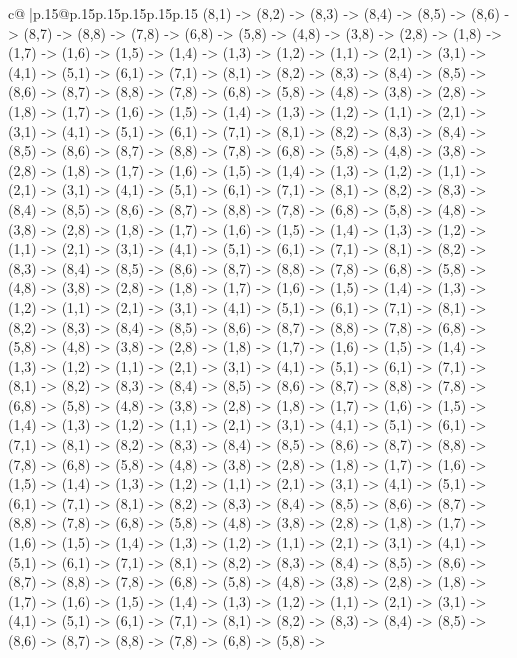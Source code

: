 \documentclass{article}
\begin{document}
{\begin{supertabular}{c@{$\;$}|p{.15\linewidth}@{}p{.15\linewidth}p{.15\linewidth}p{.15\linewidth}p{.15\linewidth}p{.15\linewidth}}
{{{(8,1) {-}> (8,2) {-}> (8,3) {-}> (8,4) {-}> (8,5) {-}> (8,6) {-}> (8,7) {-}> (8,8) {-}> (7,8) {-}> (6,8) {-}> (5,8) {-}> (4,8) {-}> (3,8) {-}> (2,8) {-}> (1,8) {-}> (1,7) {-}> (1,6) {-}> (1,5) {-}> (1,4) {-}> (1,3) {-}> (1,2) {-}> (1,1) {-}> (2,1) {-}> (3,1) {-}> (4,1) {-}> (5,1) {-}> (6,1) {-}> (7,1) {-}> (8,1) {-}> (8,2) {-}> (8,3) {-}> (8,4) {-}> (8,5) {-}> (8,6) {-}> (8,7) {-}> (8,8) {-}> (7,8) {-}> (6,8) {-}> (5,8) {-}> (4,8) {-}> (3,8) {-}> (2,8) {-}> (1,8) {-}> (1,7) {-}> (1,6) {-}> (1,5) {-}> (1,4) {-}> (1,3) {-}> (1,2) {-}> (1,1) {-}> (2,1) {-}> (3,1) {-}> (4,1) {-}> (5,1) {-}> (6,1) {-}> (7,1) {-}> (8,1) {-}> (8,2) {-}> (8,3) {-}> (8,4) {-}> (8,5) {-}> (8,6) {-}> (8,7) {-}> (8,8) {-}> (7,8) {-}> (6,8) {-}> (5,8) {-}> (4,8) {-}> (3,8) {-}> (2,8) {-}> (1,8) {-}> (1,7) {-}> (1,6) {-}> (1,5) {-}> (1,4) {-}> (1,3) {-}> (1,2) {-}> (1,1) {-}> (2,1) {-}> (3,1) {-}> (4,1) {-}> (5,1) {-}> (6,1) {-}> (7,1) {-}> (8,1) {-}> (8,2) {-}> (8,3) {-}> (8,4) {-}> (8,5) {-}> (8,6) {-}> (8,7) {-}> (8,8) {-}> (7,8) {-}> (6,8) {-}> (5,8) {-}> (4,8) {-}> (3,8) {-}> (2,8) {-}> (1,8) {-}> (1,7) {-}> (1,6) {-}> (1,5) {-}> (1,4) {-}> (1,3) {-}> (1,2) {-}> (1,1) {-}> (2,1) {-}> (3,1) {-}> (4,1) {-}> (5,1) {-}> (6,1) {-}> (7,1) {-}> (8,1) {-}> (8,2) {-}> (8,3) {-}> (8,4) {-}> (8,5) {-}> (8,6) {-}> (8,7) {-}> (8,8) {-}> (7,8) {-}> (6,8) {-}> (5,8) {-}> (4,8) {-}> (3,8) {-}> (2,8) {-}> (1,8) {-}> (1,7) {-}> (1,6) {-}> (1,5) {-}> (1,4) {-}> (1,3) {-}> (1,2) {-}> (1,1) {-}> (2,1) {-}> (3,1) {-}> (4,1) {-}> (5,1) {-}> (6,1) {-}> (7,1) {-}> (8,1) {-}> (8,2) {-}> (8,3) {-}> (8,4) {-}> (8,5) {-}> (8,6) {-}> (8,7) {-}> (8,8) {-}> (7,8) {-}> (6,8) {-}> (5,8) {-}> (4,8) {-}> (3,8) {-}> (2,8) {-}> (1,8) {-}> (1,7) {-}> (1,6) {-}> (1,5) {-}> (1,4) {-}> (1,3) {-}> (1,2) {-}> (1,1) {-}> (2,1) {-}> (3,1) {-}> (4,1) {-}> (5,1) {-}> (6,1) {-}> (7,1) {-}> (8,1) {-}> (8,2) {-}> (8,3) {-}> (8,4) {-}> (8,5) {-}> (8,6) {-}> (8,7) {-}> (8,8) {-}> (7,8) {-}> (6,8) {-}> (5,8) {-}> (4,8) {-}> (3,8) {-}> (2,8) {-}> (1,8) {-}> (1,7) {-}> (1,6) {-}> (1,5) {-}> (1,4) {-}> (1,3) {-}> (1,2) {-}> (1,1) {-}> (2,1) {-}> (3,1) {-}> (4,1) {-}> (5,1) {-}> (6,1) {-}> (7,1) {-}> (8,1) {-}> (8,2) {-}> (8,3) {-}> (8,4) {-}> (8,5) {-}> (8,6) {-}> (8,7) {-}> (8,8) {-}> (7,8) {-}> (6,8) {-}> (5,8) {-}> (4,8) {-}> (3,8) {-}> (2,8) {-}> (1,8) {-}> (1,7) {-}> (1,6) {-}> (1,5) {-}> (1,4) {-}> (1,3) {-}> (1,2) {-}> (1,1) {-}> (2,1) {-}> (3,1) {-}> (4,1) {-}> (5,1) {-}> (6,1) {-}> (7,1) {-}> (8,1) {-}> (8,2) {-}> (8,3) {-}> (8,4) {-}> (8,5) {-}> (8,6) {-}> (8,7) {-}> (8,8) {-}> (7,8) {-}> (6,8) {-}> (5,8) {-}> (4,8) {-}> (3,8) {-}> (2,8) {-}> (1,8) {-}> (1,7) {-}> (1,6) {-}> (1,5) {-}> (1,4) {-}> (1,3) {-}> (1,2) {-}> (1,1) {-}> (2,1) {-}> (3,1) {-}> (4,1) {-}> (5,1) {-}> (6,1) {-}> (7,1) {-}> (8,1) {-}> (8,2) {-}> (8,3) {-}> (8,4) {-}> (8,5) {-}> (8,6) {-}> (8,7) {-}> (8,8) {-}> (7,8) {-}> (6,8) {-}> (5,8) {-}> (4,8) {-}> (3,8) {-}> (2,8) {-}> (1,8) {-}> (1,7) {-}> (1,6) {-}> (1,5) {-}> (1,4) {-}> (1,3) {-}> (1,2) {-}> (1,1) {-}> (2,1) {-}> (3,1) {-}> (4,1) {-}> (5,1) {-}> (6,1) {-}> (7,1) {-}> (8,1) {-}> (8,2) {-}> (8,3) {-}> (8,4) {-}> (8,5) {-}> (8,6) {-}> (8,7) {-}> (8,8) {-}> (7,8) {-}> (6,8) {-}> (5,8) {-}> }}}
\end{supertabular}}
\end{document}
